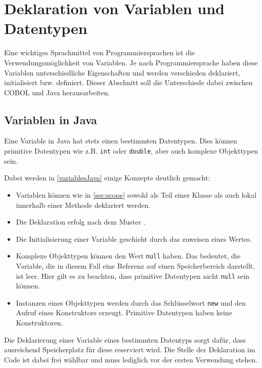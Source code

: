 \section{Deklaration von Variablen und Datentypen} \label{variables}
Eine wichtiges Sprachmittel von Programmiersprachen ist die Verwendungsmöglichkeit von Variablen. Je nach Programmiersprache haben diese Variablen unterschiedliche Eigenschaften und werden verschieden deklariert, initialisiert bzw. definiert. Dieser Abschnitt soll die Unterschiede dabei zwischen COBOL und Java herausarbeiten.\\

\subsection*{Variablen in Java}
Eine Variable in Java hat stets einen bestimmten Datentypen. Dies können primitive Datentypen wie z.B. \texttt{int} oder \texttt{double}, aber auch komplexe Objekttypen sein.\\


Dabei werden in \autoref{variablesJava} einige Konzepte deutlich gemacht:\\
\begin{itemize}
 \item Variablen können wie in \autoref{sec:scope} sowohl als Teil einer Klasse als auch lokal innerhalb einer Methode deklariert werden. 
 \item Die Deklaration erfolg nach dem Muster .
 \item Die Initialisierung einer Variable geschieht durch das zuweisen eines Wertes.
 \item Komplexe Objekttypen können den Wert \texttt{null} haben. Das bedeutet, die Variable, die in diesem Fall eine Referenz auf einen Speicherbereich darstellt, ist leer. Hier gilt es zu beachten, dass primitive Datentypen nicht \texttt{null} sein können.
 \item Instanzen eines Objekttypen werden durch das Schlüsselwort \texttt{new} und den Aufruf eines Konstruktors erzeugt. Primitive Datentypen haben keine Konstruktoren.
\end{itemize}

Die Deklarierung einer Variable eines bestimmten Datentyps sorgt dafür, dass ausreichend Speicherplatz für diese reserviert wird. Die Stelle der Deklaration im Code ist dabei frei wählbar und muss lediglich vor der ersten Verwendung stehen.\\

